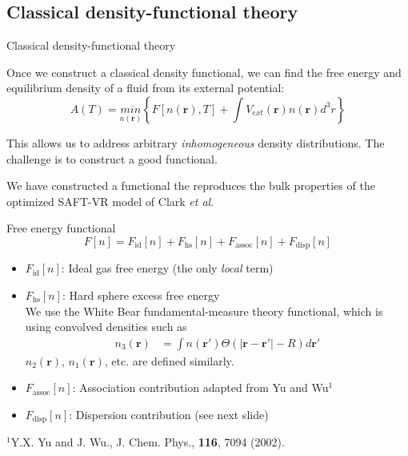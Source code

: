 \documentclass[compress]{beamer}
\newcommand{\xx}{\textbf{r}}
\begin{document}
\newcommand\rr{\mathbf{r}}

\subsection{Classical density-functional theory}

\begin{frame}{Classical density-functional theory}

  \begin{block}{}
    Once we construct a classical density functional, we can find the
    free energy and equilibrium density of a fluid from its external
    potential:
    \begin{equation*}
      A(T) = \underset{n(\xx)}{min}\left\{ F[n(\xx),T] + \int V_{ext}(\xx) n(\xx)
      d^3r\right\}
    \end{equation*}
  \end{block}
  This allows us to address arbitrary \emph{inhomogeneous} density
  distributions.  The challenge is to construct a good functional.

  \vfill

  We have constructed a functional the reproduces the bulk properties
  of the optimized SAFT-VR model of Clark \emph{et al}.

\end{frame}

\begin{frame}[fragile]{}
  \begin{block}{Free energy functional}
    \begin{equation*}
      F[n] = F_\text{id}[n] + F_\text{hs}[n] + F_\text{assoc}[n]  + F_\text{disp}[n]
    \end{equation*}
  \end{block}
  \begin{itemize}
  \item $F_\text{id}[n]$: Ideal gas free energy (the only \emph{local}
    term)
  \item $F_\text{hs}[n]$: Hard sphere excess free energy\\

    We use the White Bear fundamental-measure theory functional, which
    is using convolved densities such as
    \begin{align*}
      n_3(\rr) &= \int n(\rr') \Theta(|\rr-\rr'|-R) d\rr'
    \end{align*}
    $n_2(\rr)$, $n_1(\rr)$, etc. are defined similarly.
  \item $F_\text{assoc}[n]$: Association contribution adapted from Yu
    and Wu$^1$
  \item $F_\text{disp}[n]$: Dispersion contribution (see next slide)
  \end{itemize}

  \vfill

  \scriptsize{$^1$Y.X. Yu and J. Wu., J. Chem. Phys., \textbf{116},
    7094 (2002).}
\end{frame}
 
\end{document}
